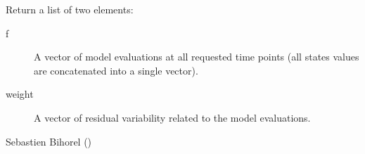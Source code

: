 %
\begin{Value}
Return a list of two elements: \begin{description}

\item[f] A vector of model evaluations at all requested time points (all
states values are concatenated into a single vector).
\item[weight] A vector of residual variability related to the model
evaluations.

\end{description}

\end{Value}
%
\begin{Author}\relax
Sebastien Bihorel ()
\end{Author}
%
\begin{SeeAlso}\relax
{}
\end{SeeAlso}
